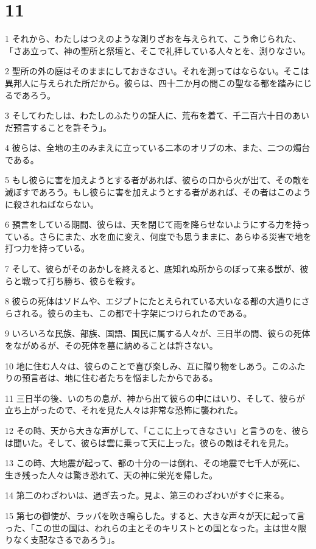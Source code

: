 \chapter{11}

\par 1 それから、わたしはつえのような測りざおを与えられて、こう命じられた、「さあ立って、神の聖所と祭壇と、そこで礼拝している人々とを、測りなさい。
\par 2 聖所の外の庭はそのままにしておきなさい。それを測ってはならない。そこは異邦人に与えられた所だから。彼らは、四十二か月の間この聖なる都を踏みにじるであろう。
\par 3 そしてわたしは、わたしのふたりの証人に、荒布を着て、千二百六十日のあいだ預言することを許そう」。
\par 4 彼らは、全地の主のみまえに立っている二本のオリブの木、また、二つの燭台である。
\par 5 もし彼らに害を加えようとする者があれば、彼らの口から火が出て、その敵を滅ぼすであろう。もし彼らに害を加えようとする者があれば、その者はこのように殺されねばならない。
\par 6 預言をしている期間、彼らは、天を閉じて雨を降らせないようにする力を持っている。さらにまた、水を血に変え、何度でも思うままに、あらゆる災害で地を打つ力を持っている。
\par 7 そして、彼らがそのあかしを終えると、底知れぬ所からのぼって来る獣が、彼らと戦って打ち勝ち、彼らを殺す。
\par 8 彼らの死体はソドムや、エジプトにたとえられている大いなる都の大通りにさらされる。彼らの主も、この都で十字架につけられたのである。
\par 9 いろいろな民族、部族、国語、国民に属する人々が、三日半の間、彼らの死体をながめるが、その死体を墓に納めることは許さない。
\par 10 地に住む人々は、彼らのことで喜び楽しみ、互に贈り物をしあう。このふたりの預言者は、地に住む者たちを悩ましたからである。
\par 11 三日半の後、いのちの息が、神から出て彼らの中にはいり、そして、彼らが立ち上がったので、それを見た人々は非常な恐怖に襲われた。
\par 12 その時、天から大きな声がして、「ここに上ってきなさい」と言うのを、彼らは聞いた。そして、彼らは雲に乗って天に上った。彼らの敵はそれを見た。
\par 13 この時、大地震が起って、都の十分の一は倒れ、その地震で七千人が死に、生き残った人々は驚き恐れて、天の神に栄光を帰した。
\par 14 第二のわざわいは、過ぎ去った。見よ、第三のわざわいがすぐに来る。
\par 15 第七の御使が、ラッパを吹き鳴らした。すると、大きな声々が天に起って言った、「この世の国は、われらの主とそのキリストとの国となった。主は世々限りなく支配なさるであろう」。
